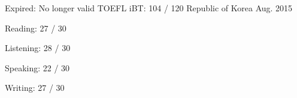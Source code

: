 \begin{cventries}
  \cventry
    {Expired: No longer valid} %
    {TOEFL iBT: 104 / 120} %
    {Republic of Korea} %
    {Aug. 2015} %
    {
      \begin{cvitems} %
        \item {Reading: 27 / 30}
        \item {Listening: 28 / 30}
        \item {Speaking: 22 / 30}
        \item {Writing: 27 / 30}
      \end{cvitems}
    }
  \fi

\end{cventries}
